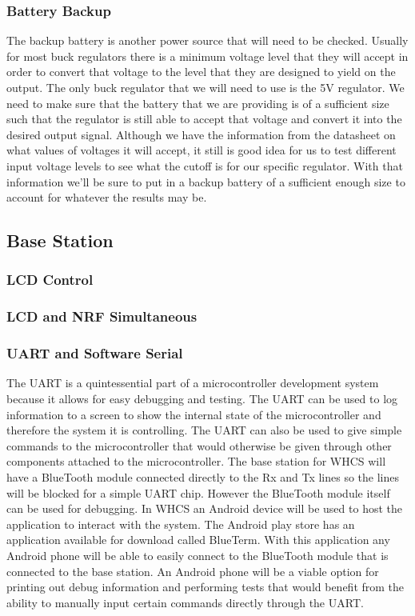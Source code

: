 \subsubsection{Battery Backup}
The backup battery is another power source that will need to be checked.
Usually for most buck regulators there is a minimum voltage level that they
will accept in order to convert that voltage to the level that they are
designed to yield on the output. The only buck regulator that we will need to
use is the 5V regulator. We need to make sure that the battery that we are
providing is of a sufficient size such that the regulator is still able to
accept that voltage and convert it into the desired output signal. Although we
have the information from the datasheet on what values of voltages it will
accept, it still is good idea for us to test different input voltage levels to
see what the cutoff is for our specific regulator. With that information
we{}'ll be sure to put in a backup battery of a sufficient enough size to
account for whatever the results may be.

\subsection{Base Station}

\subsubsection{LCD Control}

\subsubsection{LCD and NRF Simultaneous}

\subsubsection{UART and Software Serial}

The UART is a quintessential part of a microcontroller development system
because it allows for easy debugging and testing. The UART can be used to log
information to a screen to show the internal state of the microcontroller and
therefore the system it is controlling. The UART can also be used to give
simple commands to the microcontroller that would otherwise be given through
other components attached to the microcontroller. The base station for WHCS
will have a BlueTooth module connected directly to the Rx and Tx lines so the
lines will be blocked for a simple UART chip. However the BlueTooth module
itself can be used for debugging. In WHCS an Android device will be used to
host the application to interact with the system. The Android play store has an
application available for download called BlueTerm. With this application any
Android phone will be able to easily connect to the BlueTooth module that is
connected to the base station. An Android phone will be a viable option for
printing out debug information and performing tests that would benefit from the
ability to manually input certain commands directly through the UART.

